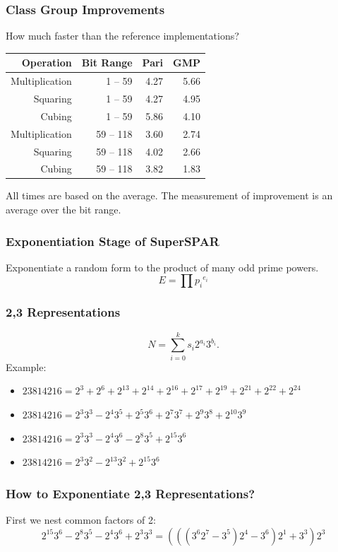 \documentclass{beamer}
\newcommand{\smallfont}{\fontsize{6pt}{7.2}\selectfont}
\begin{document}
\begin{frame}
\frametitle{Class Group Improvements}
How much faster than the reference implementations?
\begin{table}
\centering
\begin{tabular}{ | r | r | r | r | }
\hline
Operation & Bit Range & Pari & GMP \\
\hline
Multiplication & 1 -- 59 & 4.27 & 5.66 \\
Squaring & 1 -- 59 & 4.27 & 4.95 \\
Cubing & 1 -- 59 & 5.86 & 4.10 \\
Multiplication & 59 -- 118 & 3.60 & 2.74 \\
Squaring & 59 -- 118 & 4.02 & 2.66 \\
Cubing & 59 -- 118 & 3.82 & 1.83 \\
\hline
\end{tabular}
\end{table}

\bigskip
\smallfont
All times are based on the average.  The measurement of improvement is an average over the bit range.
\end{frame}



\begin{frame}
\frametitle{Exponentiation Stage of SuperSPAR}
Exponentiate a random form to the product of many odd prime powers.
\[
E = \prod {p_i}^{e_i}
\]
\end{frame}

\begin{frame}
\frametitle{2,3 Representations}
\[
N = \sum_{i=0}^k s_i 2^{a_i} 3^{b_i}.
\]
Example:
\begin{itemize}
\item $23814216 = 2^3+2^6+2^{13}+2^{14}+2^{16}+2^{17}+2^{19}+2^{21}+2^{22}+2^{24}$
\item $23814216 = 2^3 3^3 - 2^4 3^5 + 2^5 3^6  + 2^7 3^7 + 2^9 3^8 + 2^{10} 3^9$
\item $23814216 = 2^3 3^3 -2^4 3^6 -2^8 3^5 +2^{15} 3^6$
\item $23814216 = 2^3 3^2 -2^{13} 3^2 +2^{15} 3^6$
\end{itemize}
\end{frame}

\begin{frame}
\frametitle{How to Exponentiate 2,3 Representations?}
First we nest common factors of 2:
\[
2^{15} 3^6 -2^8 3^5 -2^4 3^6 +2^3 3^3 = (((3^6 2^7 - 3^5) 2^4 -3^6) 2^1 +3^3) 2^3
\]
\end{frame}
\end{document}
